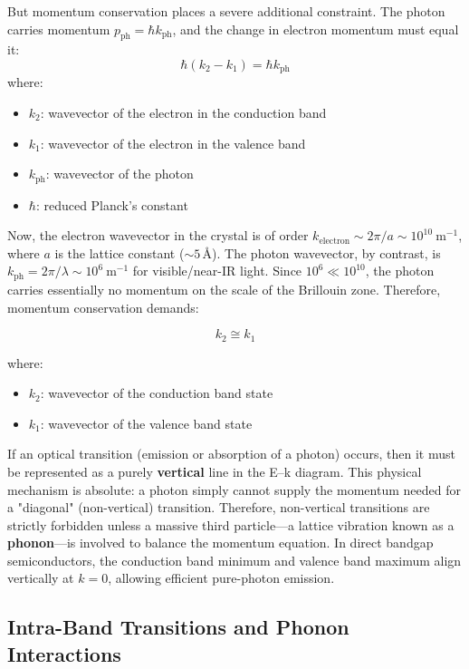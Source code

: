 But momentum conservation places a severe additional constraint. The photon carries momentum $p_\text{ph} = \hbar k_\text{ph}$, and the change in electron momentum must equal it:
\begin{equation*}
    \hbar(k_2 - k_1) = \hbar k_\text{ph}
\end{equation*}
where:
\begin{itemize}
    \item $k_2$: wavevector of the electron in the conduction band
    \item $k_1$: wavevector of the electron in the valence band
    \item $k_\text{ph}$: wavevector of the photon
    \item $\hbar$: reduced Planck's constant
\end{itemize}

Now, the electron wavevector in the crystal is of order $k_\text{electron} \sim 2\pi/a \sim 10^{10}\ \text{m}^{-1}$, where $a$ is the lattice constant ($\sim 5\,\text{\AA}$). The photon wavevector, by contrast, is $k_\text{ph} = 2\pi/\lambda \sim 10^{6}\ \text{m}^{-1}$ for visible/near-IR light. Since $10^6 \ll 10^{10}$, the photon carries essentially no momentum on the scale of the Brillouin zone. Therefore, momentum conservation demands:
\begin{keyresult}
    \begin{equation}
        k_2 \cong k_1
    \end{equation}
\end{keyresult}
where:
\begin{itemize}
    \item $k_2$: wavevector of the conduction band state
    \item $k_1$: wavevector of the valence band state
\end{itemize}

If an optical transition (emission or absorption of a photon) occurs, then it must be represented as a purely \textbf{vertical} line in the E–k diagram. This physical mechanism is absolute: a photon simply cannot supply the momentum needed for a "diagonal" (non-vertical) transition. Therefore, non-vertical transitions are strictly forbidden unless a massive third particle—a lattice vibration known as a \textbf{phonon}—is involved to balance the momentum equation. In direct bandgap semiconductors, the conduction band minimum and valence band maximum align vertically at $k=0$, allowing efficient pure-photon emission.

\subsection{Intra-Band Transitions and Phonon Interactions}

